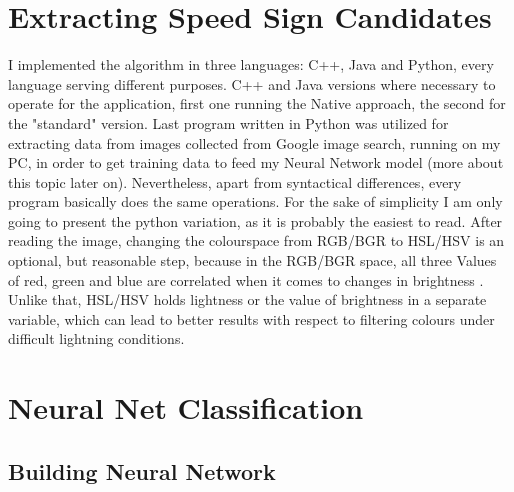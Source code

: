 \section{Extracting Speed Sign Candidates}
I implemented the algorithm in three languages: C++, Java and Python, every language serving different purposes. C++ and Java versions where necessary to operate for the application, first one running the Native approach, the second for the "standard" version. Last program written in Python was utilized for extracting data from images collected from Google image search, running on my PC, in order to get training data to feed my Neural Network model (more about this topic later on). Nevertheless, apart from syntactical differences, every program basically does the same operations. For the sake of simplicity I am only going to present the python variation, as it is probably the easiest to read.\newline
After reading the image, changing the colourspace from RGB/BGR to HSL/HSV is an optional, but reasonable step, because in the RGB/BGR space, all three Values of red, green and blue are correlated when it comes to changes in brightness \cite{imagesegmentation}. Unlike that, HSL/HSV holds lightness or the value of brightness in a separate variable, which can lead to better results with respect to filtering colours under difficult lightning conditions. \newline




\section{Neural Net Classification}
\subsection{Building Neural Network}
